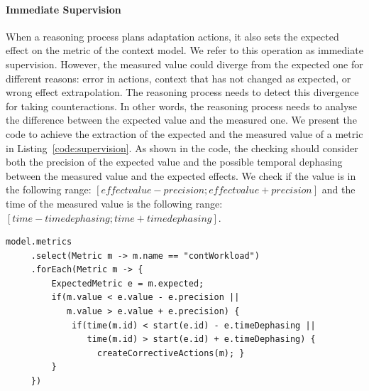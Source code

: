 \paragraph{Immediate Supervision}

When a reasoning process plans adaptation actions, it also sets the expected effect on the metric of the context model. 
We refer to this operation as immediate supervision. 
However, the measured value could diverge from the expected one for different reasons: error in actions, context that has not changed as expected, or wrong effect extrapolation.
The reasoning process needs to detect this divergence for taking counteractions.
In other words, the reasoning process needs to analyse the difference between the expected value and the measured one.
We present the code to achieve the extraction of the expected and the measured value of a metric in Listing~\ref{code:supervision}.
As shown in the code, the checking should consider both the precision of the expected value and the possible temporal dephasing between the measured value and the expected effects. 
We check if the value is in the following range:  $[effect value - precision ; effect value + precision]$ and the time of the measured value is the following range: $[time - time dephasing; time + time dephasing]$.

\begin{lstlisting}[style=customc,caption=Detection of difference between measured and expected values, label=code:supervision, basicstyle=\scriptsize]
model.metrics
     .select(Metric m -> m.name == "contWorkload")
     .forEach(Metric m -> { 
     	 ExpectedMetric e = m.expected;
     	 if(m.value < e.value - e.precision || 
     	    m.value > e.value + e.precision) {
     	     if(time(m.id) < start(e.id) - e.timeDephasing || 
     	        time(m.id) > start(e.id) + e.timeDephasing) {
     	          createCorrectiveActions(m); }
         }
     })
\end{lstlisting}


